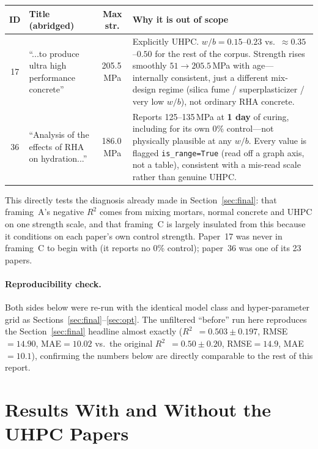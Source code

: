 \documentclass[11pt]{article}
\newcommand{\R}{$R^2$}
\begin{document}
\begin{center}\small
\begin{tabularx}{\linewidth}{@{}clcX@{}}
\toprule
ID & Title (abridged) & Max str. & Why it is out of scope \\
\midrule
17 & ``...to produce ultra high performance concrete'' & 205.5\,MPa &
  Explicitly UHPC. $w/b=0.15$--$0.23$ vs.\ $\approx0.35$--$0.50$ for the rest of the
  corpus. Strength rises smoothly $51\to205.5$\,MPa with age---internally
  consistent, just a different mix-design regime (silica fume / superplasticizer /
  very low $w/b$), not ordinary RHA concrete. \\[0.4em]
36 & ``Analysis of the effects of RHA on hydration...'' & 186.0\,MPa &
  Reports 125--135\,MPa at \textbf{1 day} of curing, including for its own 0\%
  control---not physically plausible at any $w/b$. Every value is flagged
  \texttt{is\_range=True} (read off a graph axis, not a table), consistent with a
  mis-read scale rather than genuine UHPC. \\
\bottomrule
\end{tabularx}
\label{tab:cutoff}
\end{center}

This directly tests the diagnosis already made in Section~\ref{sec:final}: that
framing~A's negative \R{} comes from mixing mortars, normal concrete and UHPC on one
strength scale, and that framing~C is largely insulated from this because it
conditions on each paper's own control strength. Paper~17 was never in framing~C to
begin with (it reports no 0\% control); paper~36 was one of its 23 papers.

\paragraph{Reproducibility check.} Both sides below were re-run with the identical
model class and hyper-parameter grid as Sections~\ref{sec:final}--\ref{sec:opt}. The
unfiltered ``before'' run here reproduces the Section~\ref{sec:final} headline almost
exactly (\R{}~$=0.503\pm0.197$, RMSE$=14.90$, MAE$=10.02$ vs.\ the original
\R{}~$=0.50\pm0.20$, RMSE$=14.9$, MAE$=10.1$), confirming the numbers below are
directly comparable to the rest of this report.

\section{Results With and Without the UHPC Papers}
\label{sec:part2-results}
\end{document}
